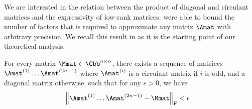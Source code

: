 We are interested in the relation between the product of diagonal and circulant matrices and the expressivity of low-rank matrices.
\citet{huhtanen2015factoring} were able to bound the number of factors that is required to approximate any matrix $\Amat$ with arbitrary precision.
We recall this result in  as it is the starting point of our theoretical analysis.

\begin{theorem} \label{theorem:ch4-huhtanen}
  For every matrix $\Mmat \in \Cbb^{n \times n}$, there exists a sequence of matrices $\Amat^{(1)} \ldots \Amat^{(2n-1)}$ where $\Amat^{(i)}$ is a circulant matrix if $i$ is odd, and a diagonal matrix otherwise, such that for any $\epsilon > 0$, we have
  \begin{equation}
    \norm{\Amat^{(1)} \ldots \Amat^{(2n-1)} - \Mmat}_\fro < \epsilon \enspace.
  \end{equation}
  \removespace
\end{theorem}







